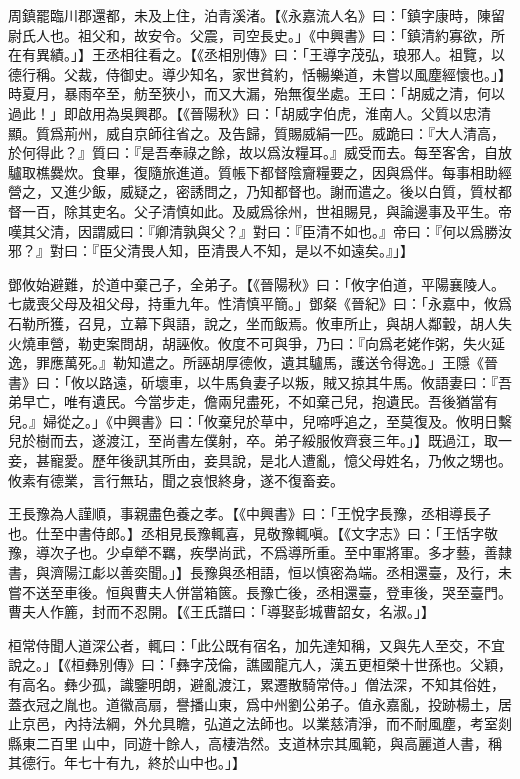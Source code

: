 周鎮罷臨川郡還都，未及上住，泊青溪渚。【《永嘉流人名》曰：「鎮字康時，陳留尉氏人也。祖父和，故安令。父震，司空長史。」《中興書》曰：「鎮清約寡欲，所在有異績。」】王丞相往看之。【《丞相別傳》曰：「王導字茂弘，琅邪人。祖覽，以德行稱。父裁，侍御史。導少知名，家世貧約，恬暢樂道，未嘗以風塵經懷也。」】時夏月，暴雨卒至，舫至狹小，而又大漏，殆無復坐處。王曰：「胡威之清，何以過此！」即啟用為吳興郡。【《晉陽秋》曰：「胡威字伯虎，淮南人。父質以忠清顯。質爲荊州，威自京師往省之。及告歸，質賜威絹⼀匹。威跪曰：『大人清高，於何得此？』質曰：『是吾奉祿之餘，故以爲汝糧耳。』威受而去。每至客舍，自放驢取樵爨炊。食畢，復隨旅進道。質帳下都督陰齎糧要之，因與爲伴。每事相助經營之，又進少飯，威疑之，密誘問之，乃知都督也。謝而遣之。後以白質，質杖都督⼀百，除其吏名。父子清慎如此。及威爲徐州，世祖賜見，與論邊事及平生。帝嘆其父清，因謂威曰：『卿清孰與父？』對曰：『臣清不如也。』帝曰：『何以爲勝汝邪？』對曰：『臣父清畏人知，臣清畏人不知，是以不如遠矣。』」】

鄧攸始避難，於道中棄己子，全弟子。【《晉陽秋》曰：「攸字伯道，平陽襄陵人。七歲喪父母及祖父母，持重九年。性清慎平簡。」鄧粲《晉紀》曰：「永嘉中，攸爲石勒所獲，召見，立幕下與語，說之，坐而飯焉。攸車所止，與胡人鄰轂，胡人失火燒車營，勒吏案問胡，胡誣攸。攸度不可與爭，乃曰：『向爲老姥作粥，失火延逸，罪應萬死。』勒知遣之。所誣胡厚德攸，遺其驢馬，護送令得逸。」王隱《晉書》曰：「攸以路遠，斫壞車，以牛馬負妻子以叛，賊又掠其牛馬。攸語妻曰：『吾弟早亡，唯有遺民。今當步走，儋兩兒盡死，不如棄己兒，抱遺民。吾後猶當有兒。』婦從之。」《中興書》曰：「攸棄兒於草中，兒啼呼追之，至莫復及。攸明日繫兒於樹而去，遂渡江，至尚書左僕射，卒。弟子綏服攸齊衰三年。」】既過江，取一妾，甚寵愛。歷年後訊其所由，妾具說，是北人遭亂，憶父母姓名，乃攸之甥也。攸素有德業，言行無玷，聞之哀恨終身，遂不復畜妾。

王長豫為人謹順，事親盡色養之孝。【《中興書》曰：「王悅字長豫，丞相導長子也。仕至中書侍郎。】丞相見長豫輒喜，見敬豫輒嗔。【《文字志》曰：「王恬字敬豫，導次子也。少卓犖不羈，疾學尚武，不爲導所重。至中軍將軍。多才藝，善隸書，與濟陽江虨以善奕聞。」】長豫與丞相語，恒以慎密為端。丞相還臺，及行，未嘗不送至車後。恒與曹夫人併當箱篋。長豫亡後，丞相還臺，登車後，哭至臺門。曹夫人作簏，封而不忍開。【《王氏譜曰：「導娶彭城曹韶女，名淑。」】

桓常侍聞人道深公者，輒曰：「此公既有宿名，加先達知稱，又與先人至交，不宜說之。」【《桓彝別傳》曰：「彝字茂倫，譙國龍亢人，漢五更桓榮十世孫也。父穎，有高名。彝少孤，識鑒明朗，避亂渡江，累遷散騎常侍。」僧法深，不知其俗姓，蓋衣冠之胤也。道徽高扇，譽播山東，爲中州劉公弟子。值永嘉亂，投跡楊土，居止京邑，內持法綱，外允具瞻，弘道之法師也。以業慈清淨，而不耐風塵，考室剡縣東⼆百里𡵙山中，同遊十餘人，高棲浩然。支道林宗其風範，與高麗道人書，稱其德行。年七十有九，終於山中也。」】

